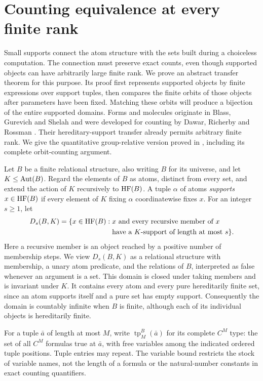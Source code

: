 \section{Counting equivalence at every finite rank}
\label{hf:section}
\label{sec:hf-transfer}

Small supports connect the atom structure with the sets built during a
choiceless computation.  The connection must preserve exact counts, even
though supported objects can have arbitrarily large finite rank.
We prove an abstract transfer theorem for this purpose.  Its proof first
represents supported objects by finite expressions over support tuples,
then compares the finite orbits of those objects after parameters have
been fixed.  Matching these orbits will produce a bijection of the entire
supported domains.
Forms and molecules originate in Blass, Gurevich and Shelah
\cite[Sections~8--9, published version]{bgs1999} and were developed
for counting by Dawar, Richerby and Rossman
\cite[Section~8, Theorem~33, author version]{drr2008}.
Their hereditary-support transfer already permits arbitrary finite rank.
We give the quantitative group-relative version proved in
\cite[Section~5, Theorem~14]{cptCompanion2026}, including its complete
orbit-counting argument.

Let $B$ be a finite relational structure, also writing $B$ for its
universe, and let $K\leq\operatorname{Aut}(B)$.  Regard the elements of $B$ as atoms,
distinct from every set, and extend the action of $K$ recursively to
$\operatorname{HF}(B)$.  A tuple $\alpha$ of atoms \emph{supports} $x\in\operatorname{HF}(B)$ if
every element of $K$ fixing $\alpha$ coordinatewise fixes $x$.
For an integer $s\geq1$, let
\[
 \begin{aligned}
 D_s(B,K)=\{x\in\operatorname{HF}(B):{}&
 \text{$x$ and every recursive member of $x$}\\
 &\text{have a $K$-support of length at most $s$}\}.
 \end{aligned}
\]
Here a recursive member is an object reached by a positive number of
membership steps.  We view $D_s(B,K)$ as a relational structure with
membership, a unary atom predicate, and the relations of $B$, interpreted
as false whenever an argument is a set.  This domain is closed under
taking members and is invariant under $K$.  It contains every atom and
every pure hereditarily finite set, since an atom supports itself and a
pure set has empty support.  Consequently the domain is countably
infinite when $B$ is finite, although each of its individual objects is
hereditarily finite.

For a tuple $\bar a$ of length at most $M$, write
$\operatorname{tp}^{B}_M(\bar a)$ for its complete $C^M$ type:
the set of all $C^M$ formulas true at $\bar a$, with free variables among
the indicated ordered tuple positions.  Tuple entries may repeat.
The variable bound restricts the stock of variable names, not the length
of a formula or the natural-number constants in exact counting
quantifiers.

